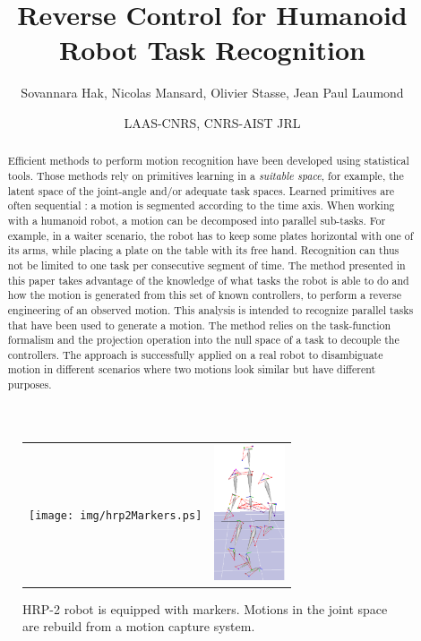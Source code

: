 \documentclass[a4paper]{article}
\date{LAAS-CNRS, CNRS-AIST JRL}
\begin{document}
\title{\LARGE Reverse Control for Humanoid Robot Task Recognition}

\author{Sovannara Hak, Nicolas Mansard, Olivier Stasse, Jean Paul Laumond%
}

\maketitle

\thispagestyle{empty}
\begin{abstract}
Efficient methods to perform motion recognition have been developed
using statistical tools. Those methods rely on primitives learning
in a \emph{suitable space}, for example, the latent space of the joint-angle and/or adequate task spaces.
Learned primitives are often sequential : a motion is segmented according to the time axis.
When working with a humanoid robot, a motion can be decomposed into
parallel sub-tasks. For example, in a waiter scenario,
the robot has to keep some plates horizontal with one of its arms, while placing a plate
on the table with its free hand.
Recognition can thus not be limited to one task per consecutive segment of 
time.
The method presented in this paper
takes advantage of the knowledge of what tasks the robot is able to do and how
the motion is generated from this set of known controllers, to perform a reverse engineering of an
observed motion. This analysis is intended to recognize parallel tasks that
have been used to generate a motion. The method relies
on the task-function formalism and the projection operation into the null space of a task to decouple
the controllers.
The approach is successfully applied on a real robot
to disambiguate motion in different scenarios where two motions look similar but have
different purposes.
\end{abstract}
\vfill
\begin{figure}[h]
  \centering
  \begin{tabular}{cc}
    \texttt{[image: img/hrp2Markers.ps]} &
    \includegraphics[height=4.0cm]{img/skel.ps} \\
  \end{tabular}
  \caption{HRP-2 robot is equipped with markers. Motions in the joint space are rebuild from a motion capture system.}
  \label{fig:hrp2Markers}
\end{figure}
\end{document}
